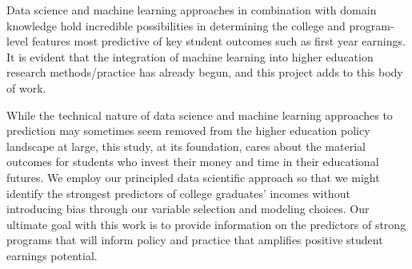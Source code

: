\documentclass[a4paper, 12pt]{article}
\begin{document}
Data science and machine learning approaches in combination with domain knowledge hold incredible possibilities in determining the college and program-level features most predictive of key student outcomes such as first year earnings. It is evident that the integration of machine learning into higher education research methods/practice has already begun, and this project adds to this 
body of work.

While the technical nature of data science and machine learning approaches to prediction may sometimes seem removed from the higher education policy landscape at large, this study, at its foundation, cares about the material outcomes for students who invest their money and time in their educational futures. We employ our principled data scientific approach so that we might identify the strongest predictors of college graduates' incomes without introducing bias through our variable selection and modeling choices. Our ultimate goal with this work is to provide information on the predictors of strong programs that will inform policy and practice that amplifies positive student earnings potential.

\pagebreak
{}
\setlength{} 
\printbibliography
\end{document}
